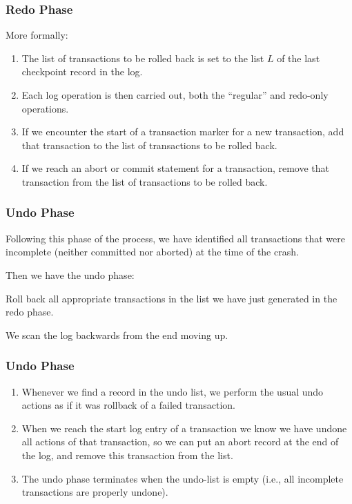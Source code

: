 \begin{frame}
\frametitle{Redo Phase}

More formally:

\begin{enumerate}
	\item The list of transactions to be rolled back is set to the list $L$ of the last checkpoint record in the log.
	\item Each log operation is then carried out, both the ``regular'' and redo-only operations.
	\item If we encounter the start of a transaction marker for a new transaction, add that transaction to the list of transactions to be rolled back.
	\item If we reach an abort or commit statement for a transaction, remove that transaction from the list of transactions to be rolled back.
\end{enumerate}


\end{frame}

\begin{frame}
\frametitle{Undo Phase}

Following this phase of the process, we have identified all transactions that were incomplete (neither committed nor aborted) at the time of the crash. 

Then we have the \alert{undo phase}: 

Roll back all appropriate transactions in the list we have just generated in the redo phase. 

We scan the log backwards from the end moving up.

\end{frame}


\begin{frame}
\frametitle{Undo Phase}

\begin{enumerate}
	\item Whenever we find a record in the undo list, we perform the usual undo actions as if it was rollback of a failed transaction.
	\item When we reach the start log entry of a transaction we know we have undone all actions of that transaction, so we can put an abort record at the end of the log, and remove this transaction from the list.
	\item The undo phase terminates when the undo-list is empty (i.e., all incomplete transactions are properly undone).
\end{enumerate}

\end{frame}



